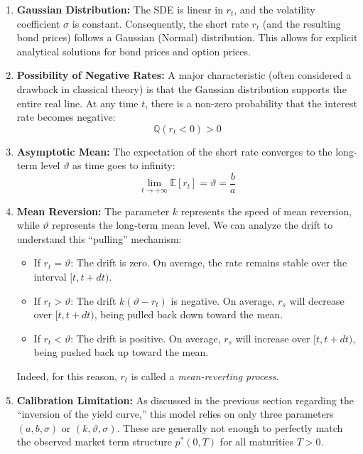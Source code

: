 \documentclass[12pt,a4paper]{article}
\theoremstyle{definition}
\newcommand{\Q}{\mathbb{Q}}
\newcommand{\E}{\mathbb{E}}
\begin{document}
\begin{enumerate}
\item \textbf{Gaussian Distribution:} The SDE is linear in $r_t$, and the volatility coefficient $\sigma$ is constant. Consequently, the short rate $r_t$ (and the resulting bond prices) follows a Gaussian (Normal) distribution. This allows for explicit analytical solutions for bond prices and option prices.

\item \textbf{Possibility of Negative Rates:} A major characteristic (often considered a drawback in classical theory) is that the Gaussian distribution supports the entire real line. At any time $t$, there is a non-zero probability that the interest rate becomes negative:
\[
\Q(r_t < 0) > 0
\]

\item \textbf{Asymptotic Mean:} The expectation of the short rate converges to the long-term level $\vartheta$ as time goes to infinity:
\[
\lim_{t \to +\infty} \E[r_t] = \vartheta = \frac{b}{a}
\]

\item \textbf{Mean Reversion:} The parameter $k$ represents the speed of mean reversion, while $\vartheta$ represents the long-term mean level. We can analyze the drift to understand this ``pulling'' mechanism:

\begin{itemize}
\item If $r_t = \vartheta$: The drift is zero. On average, the rate remains stable over the interval $[t,t+dt)$.

\item If $r_t > \vartheta$: The drift $k(\vartheta - r_t)$ is negative. On average, $r_s$ will decrease over $[t,t+dt)$, being pulled back down toward the mean.

\item If $r_t < \vartheta$: The drift is positive. On average, $r_s$ will increase over $[t,t+dt)$, being pushed back up toward the mean.
\end{itemize}

Indeed, for this reason, $r_t$ is called a \textit{mean-reverting process}.

\item \textbf{Calibration Limitation:} As discussed in the previous section regarding the ``inversion of the yield curve,'' this model relies on only three parameters $(a,b,\sigma)$ or $(k,\vartheta,\sigma)$. These are generally not enough to perfectly match the observed market term structure $p^*(0,T)$ for all maturities $T > 0$.
\end{enumerate}
\end{document}
